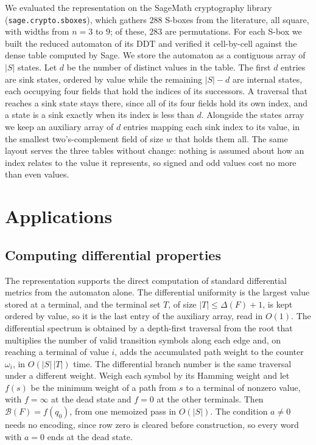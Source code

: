 \documentclass[runningheads]{llncs}
\begin{document}
We evaluated the representation on the SageMath cryptography
library~\cite{Sage2026} (\texttt{sage.crypto.\allowbreak sboxes}), which gathers
$288$ S-boxes from the literature, all square, with widths from $n=3$ to $9$; of
these, $283$ are permutations. For each S-box we built the reduced automaton of
its DDT and verified it cell-by-cell against the dense table computed by Sage. We store the automaton as a contiguous array of $|S|$ states. Let $d$ be the number of distinct values in the table. The first $d$ entries are sink states, ordered by value while the remaining $|S|-d$ are internal states, each occupying four fields that hold the indices of its successors. A traversal that reaches a sink state stays there, since all of its four fields hold its own index, and a state is a sink exactly when its index is less than $d$. Alongside the states array we keep an auxiliary array of $d$ entries mapping each sink index to its value, in the smallest two's-complement field of size $w$ that holds them all. The same layout serves the three tables without change: nothing is assumed about how an index relates to the value it represents, so signed and odd values cost no more than even values.

\section{Applications}
\label{sec:applications}

\subsection{Computing differential properties}

The representation supports the direct computation of standard differential
metrics from the automaton alone. The differential uniformity is the largest value stored at a terminal, and the terminal set $T$, of size $|T| \le \Delta(F) + 1$, is kept ordered by value, so it is the last entry of the auxiliary array, read in $O(1)$. The differential spectrum is obtained by a depth-first traversal from the root that multiplies the number of valid transition symbols along each edge and, on reaching a terminal of value $i$, adds the accumulated path weight to the counter $\omega_{i}$, in $O(|S|\, |T|)$ time. The differential branch number is the same traversal under a different weight. Weigh each symbol by its Hamming weight and let $f(s)$ be the minimum weight of a path from $s$ to a terminal of nonzero value, with $f=\infty$ at the dead state and $f=0$ at the other terminals. Then $\mathcal{B}(F) = f(q_{0})$, from one memoized pass in $O(|S|)$. The condition $a \ne 0$ needs no encoding, since row zero is cleared before construction, so every word with $a=0$ ends at the dead state.
\end{document}
